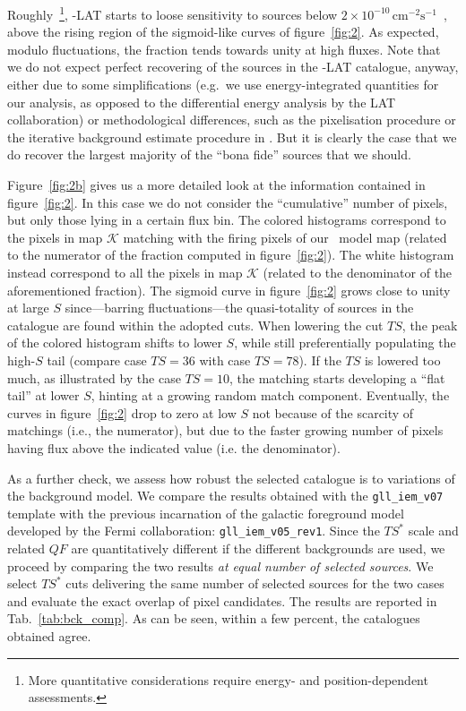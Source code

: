 Roughly~\footnote{More quantitative considerations require energy- and position-dependent assessments.}, \Fermi-LAT starts to loose sensitivity to sources below $2\times 10^{-10}\, \textrm{cm}^{-2}\textrm{s}^{-1}$~\cite{Zechlin:2015wdz,DiMauro:2017ing,Marcotulli:2020fpm,Amerio:2023uet}, above the rising region of the sigmoid-like curves of figure~\ref{fig:2}. As expected, modulo fluctuations, the fraction tends towards unity at high fluxes. Note that we do not expect perfect recovering of the sources in the \Fermi-LAT catalogue, anyway, either due to some simplifications (e.g.~we use energy-integrated quantities for our analysis, as opposed to the differential energy analysis by the LAT collaboration) or methodological differences, such as the pixelisation procedure or the iterative background estimate procedure in \Fermi. But it is clearly the case that we do recover the largest majority of the ``bona fide'' sources that we should. 

%
Figure~\ref{fig:2b} gives us a more detailed look at the information contained in figure~\ref{fig:2}. In this case we do not consider the ``cumulative'' number of pixels, but only those lying in a certain flux bin. The colored histograms correspond to the pixels in map $\mathcal{K}$ matching with the firing pixels of our \dNdS~model map (related to the numerator of the fraction computed in figure~\ref{fig:2}). The white histogram instead correspond to all the pixels in map $\mathcal{K}$ (related to the denominator of the aforementioned fraction). The sigmoid curve in figure~\ref{fig:2} grows close to unity at large $S$ since---barring fluctuations---the quasi-totality of sources in the catalogue are found within the adopted cuts. When lowering the cut $TS$, the peak of the colored histogram shifts to lower $S$, while still preferentially populating the high-$S$ tail (compare case $TS=36$ with case $TS=78$). If the $TS$ is lowered too much, as illustrated by the case $TS=10$, the matching starts developing a ``flat tail'' at lower $S$, hinting at a growing  random match component. Eventually, the curves in figure~\ref{fig:2} drop to zero at low $S$ not because of the scarcity of matchings (i.e., the numerator), but due to the faster growing number of pixels having flux above the indicated value (i.e. the denominator).

As a further check, we assess how  robust the selected catalogue is to variations of the background model. We compare the results obtained with the \verb|gll_iem_v07| template with the previous incarnation of the galactic foreground model developed by the Fermi collaboration: \verb|gll_iem_v05_rev1|. Since the $TS^*$ scale and related $QF$ are quantitatively different if the different backgrounds are used, we proceed by comparing the two results \textit{at equal number of selected sources}.  We select $TS^*$ cuts delivering the same number of selected sources for the two cases and evaluate the exact overlap of pixel candidates. The results are reported in Tab.~\ref{tab:bck_comp}. As can be seen, within a few percent, the catalogues obtained agree.


